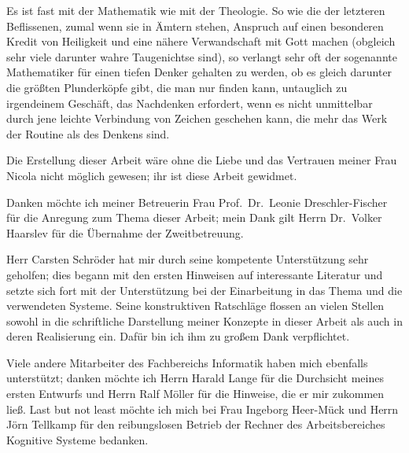 \thispagestyle{empty}\clearpage%
\fi%
%
\ifdothink\else%
%
\thispagestyle{empty}\cleardoublepage%
%
\vspace*{\fill}
\begin{fortune}
Es ist fast mit der Mathematik wie mit der Theologie. So wie die der
letzteren Beflissenen, zumal wenn sie in \"{A}mtern stehen, Anspruch auf
einen besonderen Kredit von Heiligkeit und eine n\"{a}here Verwandschaft
mit Gott machen (obgleich sehr viele darunter wahre Taugenichtse sind),
so verlangt sehr oft der sogenannte Mathematiker f\"{u}r einen tiefen
Denker gehalten zu werden, ob es gleich darunter die gr\"{o}\ss{}ten
Plunderk\"{o}pfe gibt, die man nur finden kann, untauglich zu irgendeinem
Gesch\"{a}ft, das Nachdenken erfordert, wenn es nicht unmittelbar durch
jene leichte Verbindung von Zeichen geschehen kann, die mehr das Werk
der Routine als des Denkens sind.
\end{fortune}
%
\fi
\ifbericht\else\ifbuch\else%
\thispagestyle{empty}\clearpage%
%
\vspace*{100pt}\par\noindent Die Erstellung dieser Arbeit w\"{a}re ohne die
Liebe und das Vertrauen meiner Frau Nicola nicht m\"{o}glich gewesen; ihr
ist diese Arbeit gewidmet.
%
\bigskip\par\noindent Danken m\"{o}chte ich meiner Betreuerin Frau
Prof.\ Dr.\ Leonie Dreschler-Fischer f\"{u}r die Anregung zum Thema
dieser Arbeit; mein Dank gilt Herrn Dr.\ Volker Haarslev f\"{u}r die
\"{U}bernahme der Zweitbetreuung.
%
\par Herr Carsten Schr\"{o}der hat mir durch seine kompetente
Un\-ter\-st\"{u}t\-zung sehr geholfen; dies begann mit den ersten
Hinweisen auf interessante Literatur und setzte sich fort mit der
Un\-ter\-st\"{u}t\-zung bei der Einarbeitung in das Thema und die
verwendeten Systeme. Seine konstruktiven Rat\-schl\"{a}\-ge flossen an
vielen Stellen sowohl in die schriftliche Darstellung meiner Konzepte
in dieser Arbeit als auch in deren Realisierung ein. Daf\"{u}r bin ich
ihm zu gro\ss{}em Dank verpflichtet.
%
\par Viele andere Mitarbeiter des Fachbereichs Informatik haben mich
ebenfalls unterst\"{u}tzt; danken m\"{o}chte ich Herrn Harald Lange f\"{u}r die
Durchsicht meines ersten Entwurfs und Herrn Ralf M\"{o}ller f\"{u}r die
Hinweise, die er mir zukommen lie\ss{}. Last but not least m\"{o}chte ich
mich bei Frau Ingeborg Heer-M\"{u}ck und Herrn J\"{o}rn Tellkamp f\"{u}r den
reibungslosen Betrieb der Rechner des Arbeitsbereiches Kognitive
Systeme bedanken.
%
\fi\fi%
\thispagestyle{empty}\clearpage%
\thispagestyle{empty}\cleardoublepage

